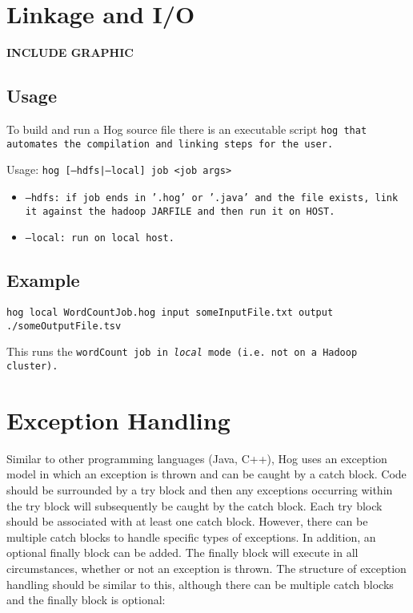 \documentclass{book}
\begin{document}

\chapter{Linkage and I/O} %
\label{cha:linkage_and_i_o}

\textbf{INCLUDE GRAPHIC}

\section{Usage} %
\label{sec:usage}


To build and run a Hog source file there is an executable script \tt hog
\rm that automates the compilation and linking steps for the user.

Usage: \tt hog [--hdfs|--local] job <job args> \rm
\begin{itemize}
  \item[] \tt --hdfs\rm: if job ends in '.hog' or '.java' and the file exists, link it against the hadoop JARFILE and then run it on HOST.
  \item[] \tt --local\rm: run on local host.
\end{itemize}

\section{Example} %
\label{sec:example}

\tt hog ­­local WordCountJob.hog ­­input someInputFile.txt ­­output
./someOutputFile.tsv \rm

This runs the \tt wordCount \rm job in \emph{local} mode (i.e. not on a Hadoop
cluster).



\chapter{Exception Handling} %
\label{cha:exception_handling}

Similar to other programming languages (Java, C++), Hog uses an exception model in
which an exception is thrown and can be caught by a catch block. Code should be
surrounded by a try block and then any exceptions occurring within the try block
will subsequently be caught by the catch block. Each try block should be
associated with at least one catch block. However, there can be multiple catch
blocks to handle specific types of exceptions. In addition, an optional finally
block can be added. The finally block will execute in all circumstances, whether
or not an exception is thrown. The structure of exception handling should be
similar to this, although there can be multiple catch blocks and the finally block
is optional:
\end{document}
